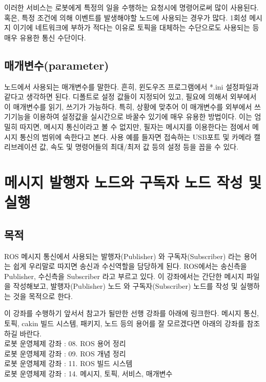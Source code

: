이러한 서비스는 로봇에게 특정의 일을 수행하는 요청시에 명령어로써 많이 사용된다. 혹은, 특정 조건에 의해 이벤트를 발생해야할 노드에 사용되는 경우가 많다. 1회성 메시지 이기에 네트워크에 부하가 적다는 이유로 토픽을 대체하는 수단으로도 사용되는 등 매우 유용한 통신 수단이다.

\subsection{매개변수(parameter)}

노드에서 사용되는 매개변수를 말한다. 흔히, 윈도우즈 프로그램에서 *.ini 설정파일과 같다고 생각하면 된다. 디폴트로 설정 값들이 지정되어 있고, 필요에 의해서 외부에서 이 매개변수를 읽기, 쓰기가 가능하다. 특히, 상황에 맞추어 이 매개변수를 외부에서 쓰기기능을 이용하여 설정값을 실시간으로 바꿀수 있기에 매우 유용한 방법이다. 이는 엄밀히 따지면, 메시지 통신이라고 볼 수 없지만, 필자는 메시지를 이용한다는 점에서 메시지 통신의 범위에 속한다고 본다. 사용 예를 들자면 접속하는 USB포트 및 카메라 캘리브레이션 값, 속도 및 명령어들의 최대/최저 값 등의 설정 등을 꼽을 수 있다.

\section{메시지 발행자 노드와 구독자 노드 작성 및 실행}

\subsection{목적}

ROS 메시지 통신에서 사용되는 발행자(Publisher) 와 구독자(Subscriber) 라는 용어는 쉽게 우리말로 따지면 송신과 수신역할을 담당하게 된다. ROS에서는 송신측을 Publisher, 수신측을 Subscriber 라고 부르고 있다. 이 강좌에서는 간단한 메시지 파일을 작성해보고, 발행자(Publisher) 노드 와 구독자(Subscriber) 노드를 작성 및 실행하는 것을 목적으로 한다.

이 강좌를 수행하기 앞서서 참고가 될만한 선행 강좌를 아래에 링크한다. 메시지 통신, 토픽, cakin 빌드 시스템, 패키지, 노드 등의 용어를 잘 모르겠다면 아래의 강좌를 참조하길 바란다.\\

로봇 운영체제 강좌 : 08. ROS 용어 정리\\
로봇 운영체제 강좌 : 09. ROS 개념 정리\\
로봇 운영체제 강좌 : 11. ROS 빌드 시스템\\
로봇 운영체제 강좌 : 14. 메시지, 토픽, 서비스, 매개변수\\

